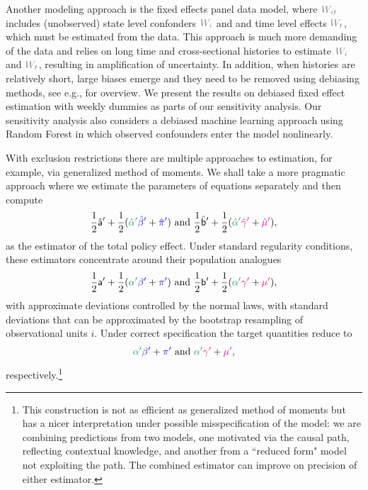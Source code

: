 \documentclass[3p, longtitle]{elsarticle}
\theoremstyle{definition}
\def\bcolor{\color{ForestGreen}}
\def\pcolor{\color{blue}}
\def\icolor{\color{magenta}}
\def\wcolor{\color{gray}}
\begin{document}
Another modeling approach is the fixed effects panel data model, where ${\wcolor W_{it}}$ includes
 (unobserved) state level confonders ${\wcolor W_i}$ and  and time level effects ${\wcolor W_t}$,
which must be estimated from the data.  This approach is much more demanding of the data and relies on long time and cross-sectional histories to estimate ${\wcolor W_i}$ and ${\wcolor W_t}$, resulting in amplification of uncertainty. In addition, when histories are relatively short,  large biases emerge and they need to be removed using debiasing methods, see e.g., \cite{chen2019mastering} for overview. We present the results
on debiased fixed effect estimation with weekly dummies as parts of our sensitivity analysis. Our sensitivity analysis also considers a debiased machine learning approach  using Random Forest in which observed confounders enter the model nonlinearly.


With exclusion restrictions there are multiple approaches to estimation, for example,
via generalized method of moments. We shall take a more pragmatic approach where we estimate
the parameters of equations separately and then compute
\[
 \frac{1}{2} \hat {\mathsf{a}}'  + \frac{1}{2}  ( {\bcolor \hat \alpha '}  {\pcolor \hat \beta' }+{\pcolor\hat \pi'} ) \text{ and }
 \frac{1}{2} \hat{\mathsf{b}}'  + \frac{1}{2}  ( {\bcolor \hat \alpha '}  {\icolor \hat \gamma'} + {\icolor \hat \mu'}),
\]
as the estimator of the total policy effect. Under standard regularity conditions,
these estimators concentrate around  their population analogues
\[
 \frac{1}{2}  {\mathsf{a}}'  + \frac{1}{2}  ( {\bcolor \alpha '}  {\pcolor \beta' }+{\pcolor \pi'} ) \text{ and }
 \frac{1}{2} {\mathsf{b}}'  + \frac{1}{2}  ( {\bcolor  \alpha '}  {\icolor \gamma'} + {\icolor \mu'}),
\]
with approximate deviations controlled by the normal laws, with standard deviations that can be approximated by the bootstrap
resampling of observational units $i$. Under correct specification the target quantities
reduce to $$  {\bcolor \alpha '}  {\pcolor  \beta' }+{\pcolor \pi'} \text{ and } {\bcolor  \alpha '}  {\icolor  \gamma'} + {\icolor  \mu'},$$ respectively.\footnote{This construction is not as efficient as generalized method of moments
but has a nicer interpretation under possible misspecification of the model: we are combining predictions
from two models, one motivated via the causal path, reflecting contextual knowledge, and another from a ``reduced form" model not exploiting the path. The combined estimator can improve on precision of either estimator.}
\end{document}
